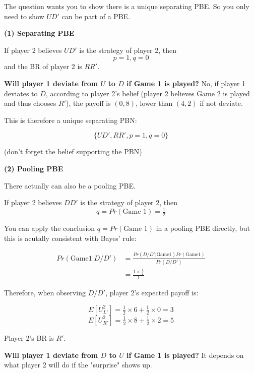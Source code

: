 \documentclass{article}
\begin{document}
\begin{mdframed}[backgroundcolor=blue!20,linecolor=white]
\medskip

The question wants you to show there is a unique separating PBE. So you only need to show $UD'$ can be part of a PBE.

\bigskip

\textbf{(1) Separating PBE}

\medskip

If player 2 believes $UD'$ is the strategy of player 2, then
$$p=1, q=0$$
and the BR of player 2 is $RR'$.

\medskip

\textbf{Will player 1 deviate from $U$ to $D$ if Game 1 is played? }No, if player 1
deviates to $D$, according to player 2's belief (player 2 believes Game 2 is played and thus chooses $R'$), the payoff is $(0,8)$, lower than $(4,2)$ if not deviate.

\medskip

This is therefore a unique separating PBN:

$$\{UD',RR',p=1,q=0\}$$

(don't forget the belief supporting the PBN)

\bigskip

\textbf{(2) Pooling PBE}

\medskip

There actually can also be a pooling PBE.

\medskip

If player 2 believes $DD'$ is the strategy of player 2, then
$$q=Pr(\text{Game 1})=\tfrac12$$

\medskip

You can apply the conclusion $q=Pr(\text{Game 1})$ in a pooling PBE directly, but this is acutally consistent with Bayes' rule:

\begin{align*}
Pr(\text{Game1} | D/D') &= \frac{Pr(D/D'|\text{Game1}) Pr(\text{Game1})}{Pr(D/D')} \\
&= \frac{1 \times \tfrac12}{1}
\end{align*}

Therefore, when observing $D/D'$, player 2's expected payoff is:

$$E[U^2_{L'}] = \tfrac12 \times 6+ \tfrac12 \times 0 = 3$$
$$E[U^2_{R'}] = \tfrac12 \times 8+ \tfrac12 \times 2 = 5$$

Player 2's BR is $R'$.

\medskip

\textbf{Will player 1 deviate from $D$ to $U$ if Game 1 is played?} It depends on what player 2 will do if the "surprise" shows up.


\end{mdframed}
\end{document}
